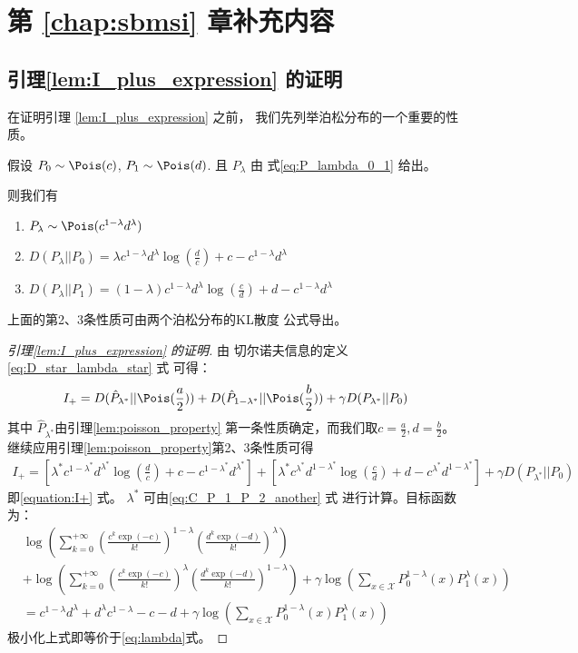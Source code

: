 \chapter{第 \ref{chap:sbmsi} 章补充内容}
		
\section{引理\ref{lem:I_plus_expression} 的证明}
在证明引理
\ref{lem:I_plus_expression}  之前，
我们先列举泊松分布的一个重要的性质。
\begin{lemma}\label{lem:poisson_property}
假设 $P_0 \sim \Pois(c)$, $P_1 \sim \Pois(d)$.
且 $P_{\lambda}$ 由 式\eqref{eq:P_lambda_0_1}
给出。

则我们有
\begin{enumerate}
    \item $P_{\lambda} \sim \Pois(c^{1-\lambda} d^{\lambda})$
    \item $D(P_{\lambda}||P_0) = 
    \lambda c^{1-\lambda}d^{\lambda}\log(\frac{d}{c}) + c-c^{1-\lambda}d^{\lambda}$
    \item $D(P_{\lambda}||P_1) = (1-\lambda)
    c^{1-\lambda}d^{\lambda}\log(\frac{c}{d})
    + d-c^{1-\lambda}d^{\lambda}$
\end{enumerate}
\end{lemma}
上面的第2、3条性质可由两个泊松分布的KL散度
公式导出。
\begin{proof}[引理\ref{lem:I_plus_expression} 的证明]
由 切尔诺夫信息的定义 \eqref{eq:D_star_lambda_star} 式
可得：
$$
I_+ = D(\hat{P}_{\lambda^*} || \Pois(\frac{a}{2}))
+ D(\hat{P}_{1-\lambda^*} || \Pois(\frac{b}{2}))
+ \gamma D(P_{\lambda^*} || P_0)
$$
其中 $\hat{P}_{\lambda^*}$由引理\ref{lem:poisson_property}
第一条性质确定，而我们取$c=\frac{a}{2}, d=\frac{b}{2}$。
继续应用引理\ref{lem:poisson_property}第2、3条性质可得
\begin{align*}
    I_+ = \left[\lambda^* c^{1-\lambda^*}d^{\lambda^*}
    \log(\frac{d}{c})+ c-c^{1-\lambda^*}d^{\lambda^*}
    \right]
+ \left[\lambda^* c^{\lambda^*}d^{1-\lambda^*}\log(\frac{c}{d})
+ d - c^{\lambda^*}d^{1-\lambda^*}\right]
+ \gamma D(P_{\lambda^*} || P_0)
\end{align*}
即\eqref{equation:I+} 式。
$\lambda^*$ 可由\eqref{eq:C_P_1_P_2_another} 式
进行计算。目标函数为：
\begin{align*}
&\log\left(\sum_{k=0}^{+\infty} \left(\frac{c^k\exp(-c)}{k!}
\right)^{1-\lambda}
\left(\frac{d^k\exp(-d)}{k!} \right)^{\lambda}
\right) \\
& + \log\left(\sum_{k=0}^{+\infty} \left(\frac{c^k\exp(-c)}{k!}
\right)^{\lambda}
\left(\frac{d^k\exp(-d)}{k!} \right)^{1-\lambda}
\right)+
\gamma\log(\sum_{x\in \mathcal{X}}P^{1-\lambda}_0(x) P^{\lambda}_1(x)
)\\
& = c^{1-\lambda} d^{\lambda} 
+ d^{\lambda} c^{1-\lambda} -c -d +
\gamma\log(\sum_{x\in \mathcal{X}}P^{1-\lambda}_0(x) P^{\lambda}_1(x)
)
\end{align*}
极小化上式即等价于\eqref{eq:lambda}式。
\end{proof}
